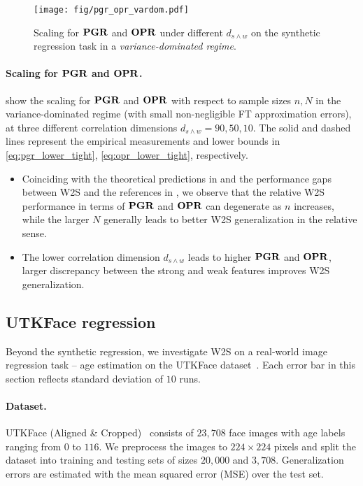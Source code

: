 \begin{figure}[!ht]
    \centering
    \texttt{[image: fig/pgr\_opr\_vardom.pdf]}%
    \caption{Scaling for $\mathbf{PGR}$ and $\mathbf{OPR}$ under different $d_{s \wedge w}$ on the synthetic regression task in a \emph{variance-dominated regime}.}\label{fig:pgr_opr_vardom}
\end{figure}

\paragraph{Scaling for $\mathbf{PGR}$ and $\mathbf{OPR}$.}
 show the scaling for $\mathbf{PGR}$ and $\mathbf{OPR}$ with respect to sample sizes $n, N$ in the variance-dominated regime (with small non-negligible FT approximation errors), at three different correlation dimensions $d_{s \wedge w} = 90, 50, 10$. The solid and dashed lines represent the empirical measurements and lower bounds in \eqref{eq:pgr_lower_tight}, \eqref{eq:opr_lower_tight}, respectively.
\begin{itemize}
    \item Coinciding with the theoretical predictions in  and the performance gaps between W2S and the references in , we observe that the relative W2S performance in terms of $\mathbf{PGR}$ and $\mathbf{OPR}$ can degenerate as $n$ increases, while the larger $N$ generally leads to better W2S generalization in the relative sense. 
    \item The lower correlation dimension $d_{s \wedge w}$ leads to higher $\mathbf{PGR}$ and $\mathbf{OPR}$, \ie larger discrepancy between the strong and weak features improves W2S generalization.
\end{itemize}



\subsection{UTKFace regression}\label{sec:exp_img_reg}
Beyond the synthetic regression, we investigate W2S on a real-world image regression task -- age estimation on the UTKFace dataset~\citep{zhang2017age}. Each error bar in this section reflects standard deviation of $10$ runs. 

\paragraph{Dataset.} 
UTKFace (Aligned \& Cropped)~\citep{zhang2017age} consists of $23,708$ face images with age labels ranging from $0$ to $116$. We preprocess the images to $224 \times 224$ pixels and split the dataset into training and testing sets of sizes $20,000$ and $3,708$.
Generalization errors are estimated with the mean squared error (MSE) over the test set. 

